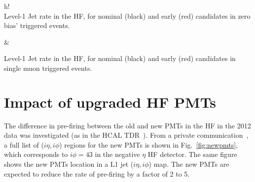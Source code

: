 \documentclass[11pt]{cmspaperpdf}
\begin{document}
\begin{2figures}{h!}
 \\
\caption{Level-1 Jet rate in the HF, for nominal (black) and early (red) candidates in zero bias' triggered events.}\label{fig:fwdrate_minb} &
\caption{Level-1 Jet rate in the HF, for nominal (black) and early (red) candidates in single muon triggered events.}\label{fig:fwdrate_smu}
\end{2figures}

\section{Impact of upgraded HF PMTs}

The difference in pre-firing between the old and new PMTs in the HF in the 2012 data was investigated (as in the HCAL TDR~\cite{hcaltdr}). From a private communication~\cite{privcomm}, a full list of ($i\eta, i\phi$) regions for the new PMTs is shown in Fig.~\ref{fig:newpmts}, which corresponds to $i \phi=43$ in the negative $\eta$ HF detector. The same figure shows the new PMTs location in a L1 jet ($i\eta, i\phi$) map. The new PMTs are expected to reduce the rate of pre-firing by a factor of 2 to 5.
\end{document}
